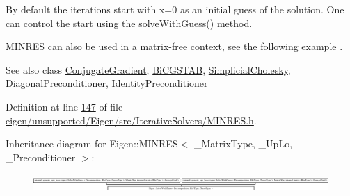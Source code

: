By default the iterations start with x=0 as an initial guess of the solution. One can control the start using the \hyperlink{group___iterative_linear_solvers___module_adcc18d1ab283786dcbb5a3f63f4b4bd8}{solve\+With\+Guess()} method.

\hyperlink{group___iterative_linear_solvers___module_class_eigen_1_1_m_i_n_r_e_s}{M\+I\+N\+R\+ES} can also be used in a matrix-\/free context, see the following \hyperlink{group___matrixfree_solver_example}{example }.

\begin{DoxySeeAlso}{See also}
class \hyperlink{group___iterative_linear_solvers___module_class_eigen_1_1_conjugate_gradient}{Conjugate\+Gradient}, \hyperlink{group___iterative_linear_solvers___module_class_eigen_1_1_bi_c_g_s_t_a_b}{Bi\+C\+G\+S\+T\+AB}, \hyperlink{group___sparse_cholesky___module_class_eigen_1_1_simplicial_cholesky}{Simplicial\+Cholesky}, \hyperlink{group___iterative_linear_solvers___module_class_eigen_1_1_diagonal_preconditioner}{Diagonal\+Preconditioner}, \hyperlink{group___iterative_linear_solvers___module_class_eigen_1_1_identity_preconditioner}{Identity\+Preconditioner} 
\end{DoxySeeAlso}


Definition at line \hyperlink{eigen_2unsupported_2_eigen_2src_2_iterative_solvers_2_m_i_n_r_e_s_8h_source_l00147}{147} of file \hyperlink{eigen_2unsupported_2_eigen_2src_2_iterative_solvers_2_m_i_n_r_e_s_8h_source}{eigen/unsupported/\+Eigen/src/\+Iterative\+Solvers/\+M\+I\+N\+R\+E\+S.\+h}.

Inheritance diagram for Eigen\+:\+:M\+I\+N\+R\+ES$<$ \+\_\+\+Matrix\+Type, \+\_\+\+Up\+Lo, \+\_\+\+Preconditioner $>$\+:\begin{figure}[H]
\begin{center}
\leavevmode
\includegraphics[height=0.733753cm]{group___iterative_linear_solvers___module}
\end{center}
\end{figure}
